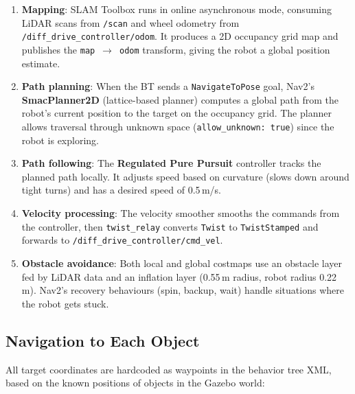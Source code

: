 \documentclass[12pt, a4paper]{article}
\begin{document}
\begin{enumerate}
    \item \textbf{Mapping}: SLAM Toolbox runs in online asynchronous mode, consuming LiDAR scans from \texttt{/scan} and wheel odometry from \texttt{/diff\_drive\_controller/odom}. It produces a 2D occupancy grid map and publishes the \texttt{map}~$\rightarrow$~\texttt{odom} transform, giving the robot a global position estimate.

    \item \textbf{Path planning}: When the BT sends a \texttt{NavigateToPose} goal, Nav2's \textbf{SmacPlanner2D} (lattice-based planner) computes a global path from the robot's current position to the target on the occupancy grid. The planner allows traversal through unknown space (\texttt{allow\_unknown: true}) since the robot is exploring.

    \item \textbf{Path following}: The \textbf{Regulated Pure Pursuit} controller tracks the planned path locally. It adjusts speed based on curvature (slows down around tight turns) and has a desired speed of 0.5\,m/s.

    \item \textbf{Velocity processing}: The velocity smoother smooths the commands from the controller, then \texttt{twist\_relay} converts \texttt{Twist} to \texttt{TwistStamped} and forwards to \texttt{/diff\_drive\_controller/cmd\_vel}.

    \item \textbf{Obstacle avoidance}: Both local and global costmaps use an obstacle layer fed by LiDAR data and an inflation layer (0.55\,m radius, robot radius 0.22\,m). Nav2's recovery behaviours (spin, backup, wait) handle situations where the robot gets stuck.
\end{enumerate}

\subsection{Navigation to Each Object}

All target coordinates are hardcoded as waypoints in the behavior tree XML, based on the known positions of objects in the Gazebo world:
\end{document}
